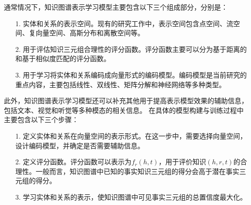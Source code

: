 \documentclass[algorithmlist, AutoFakeBold, AutoFakeSlant, figurelist, tablelist, nomlist, engineering]{seuthesix}
\begin{document}
通常情况下，知识图谱表示学习模型主要包含以下三个组成部分，分别是：
\begin{itemize}
  \item [1.] 实体和关系的表示空间。现有的研究工作中，表示空间包含点空间、流空间、复向量空间、高斯分布和离散空间等。
  \item [2.] 用于评估知识三元组合理性的评分函数。评分函数主要可以分为基于距离的和基于相似度匹配的评分函数。
  \item [3.] 用于学习将实体和关系编码成向量形式的编码模型。编码模型是当前研究的重点内容，主要包括线性、双线性、矩阵分解和神经网络等多种类型。
\end{itemize}

此外，知识图谱表示学习模型还可以补充其他用于提高表示模型效果的辅助信息，包括文本、视觉和听觉等多种模态的相关信息。
在具体的模型构建与训练过程中主要包含以下三个步骤：
\begin{itemize}
  \item [1.] 定义实体和关系在向量空间的表示形式。在这一步中，需要选择向量空间，设计编码模型，并确定是否需要辅助信息。
  \item [2.] 定义评分函数。评分函数可以表示为$f_r(h, t)$，用于评价知识$(h, r, t)$的合理性。一般而言，知识图谱中已知的事实知识三元组的得分会高于潜在事实三元组的得分。
  \item [3.] 学习实体和关系的表示，使知识图谱中可见事实三元组的总置信度最大化。
\end{itemize}
\end{document}

